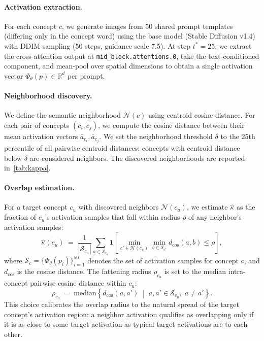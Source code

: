 \paragraph{Activation extraction.}
For each concept $c$, we generate images from 50 shared prompt templates (differing only in the concept word) using the base model (Stable Diffusion v1.4) with DDIM sampling (50 steps, guidance scale 7.5). At step $t^*{=}25$, we extract the cross-attention output at \texttt{mid\_block.attentions.0}, take the text-conditioned component, and mean-pool over spatial dimensions to obtain a single activation vector $\Phi_\theta(p) \in \mathbb{R}^d$ per prompt. 

\paragraph{Neighborhood discovery.}
We define the semantic neighborhood $\mathcal{N}(c)$ using centroid cosine distance. For each pair of concepts $(c_i, c_j)$, we compute the cosine distance between their mean activation vectors $\bar{a}_{c_i}, \bar{a}_{c_j}$. We set the neighborhood threshold $\delta$ to the 25th percentile of all pairwise centroid distances: concepts with centroid distance below $\delta$ are considered neighbors. The discovered neighborhoods are reported in~\cref{tab:kappa}.

\paragraph{Overlap estimation.}
For a target concept $c_u$ with discovered neighbors $\mathcal{N}(c_u)$, we estimate $\hat\kappa$ as the fraction of $c_u$'s activation samples that fall within radius $\rho$ of any neighbor's activation samples:
\begin{equation}
    \hat\kappa(c_u) \;=\; \frac{1}{|\mathcal{S}_{c_u}|} \sum_{a \in \mathcal{S}_{c_u}} \mathbf{1}\!\left[\min_{c' \in \mathcal{N}(c_u)} \min_{b \in \mathcal{S}_{c'}} d_{\cos}(a, b) \leq \rho\right],
\end{equation}
where $\mathcal{S}_c = \{\Phi_\theta(p_i)\}_{i=1}^{50}$ denotes the set of activation samples for concept $c$, and $d_{\cos}$ is the cosine distance. 
The fattening radius $\rho_{c_u}$ is set to the median intra-concept pairwise cosine distance within $c_u$:
\begin{equation}
    \rho_{c_u} \;=\; \mathrm{median}\!\left\{d_{\cos}(a, a') \;\middle|\; a, a' \in \mathcal{S}_{c_u},\; a \neq a'\right\}.
\end{equation}
This choice calibrates the overlap radius to the natural spread of the target concept's activation region: a neighbor activation qualifies as overlapping only if it is as close to some target activation as typical target activations are to each other.

